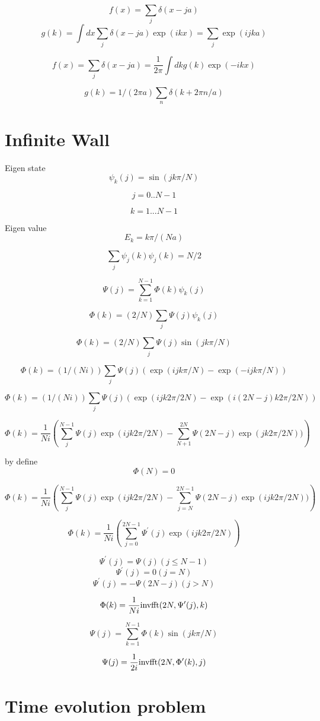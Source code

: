 \documentclass[12pt,twoside]{article}
\begin{document}
$$
f(x) = \sum_j \delta(x - ja)
$$
$$
g(k) = \int dx \sum_j \delta(x - ja) \exp(ikx) = \sum_j \exp(ijka)
$$

$$
f(x) = \sum_j \delta(x - ja) = \frac{1}{2\pi}\int dk g(k) \exp(-ikx)
$$

$$
g(k) = 1/(2\pi a)\sum_n \delta(k+2\pi n/a)
$$


\section{Infinite Wall}

Eigen state
$$
\psi_k(j) = \sin(jk\pi/N)
$$

$$
j=0..N-1
$$

$$
k=1...N-1
$$

Eigen value
$$
E_k = k\pi/(N a)
$$

$$
\sum_j \psi_j(k)\psi_j(k) = N/2
$$

$$
\Psi(j) = \sum_{k=1}^{N-1} \Phi(k) \psi_k(j)
$$

$$
\Phi(k) = (2/N) \sum_j \Psi(j) \psi_k(j)
$$

$$
\Phi(k) = (2/N) \sum_j \Psi(j) \sin(jk\pi/N)
$$

$$
\Phi(k) = (1/(Ni)) \sum_j \Psi(j) (\exp(ijk\pi/N) - \exp(-ijk\pi/N))
$$

$$
\Phi(k) = (1/(Ni)) \sum_j \Psi(j) (\exp(ijk2\pi/2N) - \exp(i(2N-j)k2\pi/2N))
$$

$$
\Phi(k) = \frac{1}{Ni}\left(\sum_j^{N-1} \Psi(j)\exp(ijk2\pi/2N) - \sum_{N+1}^{2N} \Psi(2N-j)\exp(jk2\pi/2N))\right)
$$

by define
$$
\Phi(N)=0
$$

$$
\Phi(k) = \frac{1}{Ni}\left(\sum_j^{N-1} \Psi(j)\exp(ijk2\pi/2N) - \sum_{j=N}^{2N-1} \Psi(2N-j)\exp(ijk2\pi/2N))\right)
$$

$$
\Phi(k) = \frac{1}{Ni}\left(\sum_{j=0}^{2N-1} \Psi^\prime(j)\exp(ijk2\pi/2N)\right)
$$

$$
\Psi^\prime(j) = \Psi(j) (j \le N-1)
$$
$$
\Psi^\prime(j) = 0 (j = N)
$$
$$
\Psi^\prime(j) = -\Psi(2N-j) (j > N)
$$

$$
\Phi(k) = \frac{1}{Ni} {\rm inv fft}(2N, \Psi^\prime(j), k)
$$


$$
\Psi(j) = \sum_{k=1}^{N-1} \Phi(k) \sin(jk\pi/N)
$$

$$
\Psi(j) = \frac{1}{2i} {\rm inv fft}(2N, \Phi^\prime(k), j)
$$

\section{Time evolution problem}
\end{document}
